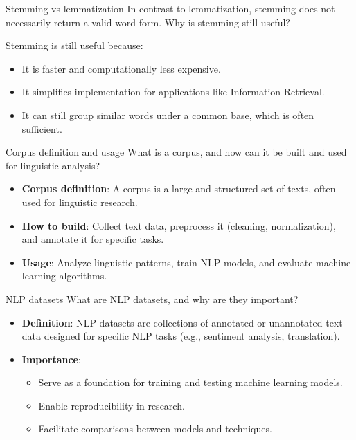 \documentclass{article}
\begin{document}
\begin{exercise}{Stemming vs lemmatization}
  In contrast to lemmatization, stemming does not necessarily return a valid word form. Why is stemming still useful?

  \begin{solution}
    Stemming is still useful because:
    \begin{itemize}
        \item It is faster and computationally less expensive.
        \item It simplifies implementation for applications like Information Retrieval.
        \item It can still group similar words under a common base, which is often sufficient.
    \end{itemize}
  \end{solution}
\end{exercise}

\begin{exercise}{Corpus definition and usage}
  What is a corpus, and how can it be built and used for linguistic analysis?

  \begin{solution}
    \begin{itemize}
        \item \textbf{Corpus definition}: A corpus is a large and structured set of texts, often used for linguistic research.
        \item \textbf{How to build}: Collect text data, preprocess it (cleaning, normalization), and annotate it for specific tasks.
        \item \textbf{Usage}: Analyze linguistic patterns, train NLP models, and evaluate machine learning algorithms.
    \end{itemize}
  \end{solution}
\end{exercise}

\begin{exercise}{NLP datasets}
  What are NLP datasets, and why are they important?

  \begin{solution}
    \begin{itemize}
        \item \textbf{Definition}: NLP datasets are collections of annotated or unannotated text data designed for specific NLP tasks (e.g., sentiment analysis, translation).
        \item \textbf{Importance}:
        \begin{itemize}
            \item Serve as a foundation for training and testing machine learning models.
            \item Enable reproducibility in research.
            \item Facilitate comparisons between models and techniques.
        \end{itemize}
    \end{itemize}
  \end{solution}
\end{exercise}
\end{document}
